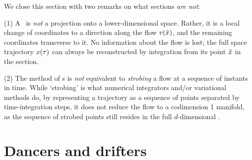 \documentclass[aip,cha,reprint,
secnumarabic,
nofootinbib, tightenlines,
nobibnotes, showkeys, showpacs,
groupedaddress
]{revtex4-1}
\begin{document}
We close this section with two remarks on what sections \emph{are not}:

(1) A \PoincSec\ is {\em not} a projection onto a lower-dimensional
space. Rather, it is a local change of coordinates to a direction along
the flow $v(\hat{x})$, and the remaining coordinates transverse to it.
No information about the flow is lost; the full space trajectory
$x(\tau)$ can always be reconstructed by integration from its point
$\hat{x}$ in the section.

(2) The method of \PoincSec s is {\em not} equivalent to \emph{strobing}
a flow at a sequence of instants in time. While `strobing' is what
numerical integrators and/or variational methods do, by
representing a trajectory as a sequence of points separated by
time-integration steps, it does not reduce the flow to a codimension 1
manifold, as the sequence of strobed points still resides in the full
$d$-dimensional \statesp.


\section{Dancers and drifters}
\label{s:symm}
\end{document}
